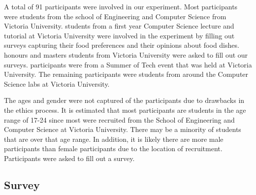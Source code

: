 A total of 91 participants were involved in our experiment. Most participants were students from the school of Engineering and Computer Science from Victoria University.  students from a first year Computer Science lecture and tutorial at Victoria University were involved in the experiment by filling out surveys capturing their food preferences and their opinions about food dishes.  honours and masters students from Victoria University were asked to fill out our surveys.  participants were from a Summer of Tech event that was held at Victoria University. The remaining participants were students from around the Computer Science labs at Victoria University.

The ages and gender were not captured of the participants due to drawbacks in the ethics process. It is estimated that most participants are students in the age range of 17-24 since most were recruited from the School of Engineering and Computer Science at Victoria University. There may be a minority of students that are over that age range. In addition, it is likely there are more male participants than female participants due to the location of recruitment. Participants were asked to fill out a survey.


\subsection{Survey}

